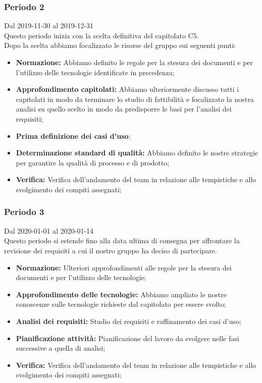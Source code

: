 \subsubsection{Periodo 2} 
Dal 2019-11-30 al 2019-12-31\\
Questo periodo inizia con la scelta definitiva del capitolato C5.\\
Dopo la scelta abbiamo focalizzato le risorse del gruppo sui seguenti punti:
\begin{itemize}
	\item \textbf{Normazione: }Abbiamo definito le regole per la stesura dei documenti e per l'utilizzo delle tecnologie identificate in precedenza;
	\item \textbf{Approfondimento capitolati: }Abbiamo ulteriormente discusso tutti i capitolati in modo da terminare lo studio di fattibilità e focalizzato la nostra analisi su quello scelto in modo da predisporre le basi per l'analisi dei requisiti;
	\item \textbf{Prima definizione dei casi d'uso};
	\item \textbf{Determinazione standard di qualità: }Abbiamo definito le nostre strategie per garantire la qualità di processo e di prodotto;
	\item \textbf{Verifica: }Verifica dell'andamento del team in relazione alle tempistiche e allo svolgimento dei compiti assegnati;
\end{itemize}
\subsubsection{Periodo 3}
 Dal 2020-01-01 al 2020-01-14\\
 Questo periodo si estende fino alla data ultima di consegna per affrontare la revisione dei requisiti a cui il nostro gruppo ha deciso di partecipare.\\
 \begin{itemize}
	\item \textbf{Normazione: }Ulteriori approfondimenti alle regole per la stesura dei documenti e per l'utilizzo delle tecnologie;
	\item \textbf{Approfondimento delle tecnologie: }Abbiamo ampliato le nostre conoscenze sulle tecnologie richieste dal capitolato per essere svolto;
	\item \textbf{Analisi dei requisiti: } Studio dei requisiti e raffinamento dei casi d'uso;
	\item \textbf{Pianificazione attività: }Pianificazione del lavoro da svolgere nelle fasi successive a quella di analisi;
	\item \textbf{Verifica: }Verifica dell'andamento del team in relazione alle tempistiche e allo svolgimento dei compiti assegnati;

 \end{itemize}
